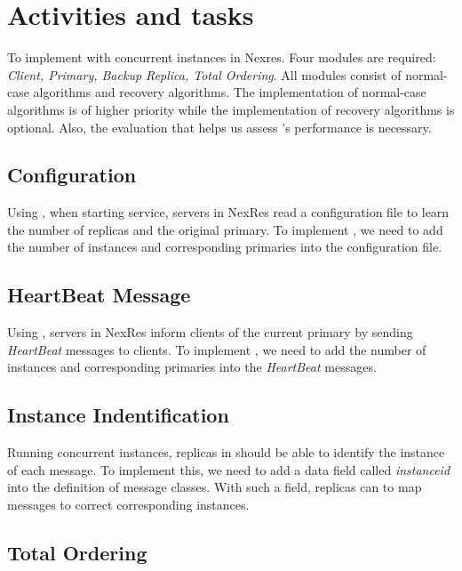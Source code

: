 \section{Activities and tasks}

\par To implement \RCC{} with concurrent \PBFT{} instances in Nexres. Four modules are required: \emph{Client, 
Primary, Backup Replica, Total Ordering}. All modules consist of normal-case algorithms and recovery algorithms. 
The implementation of normal-case algorithms is of higher priority while the implementation of recovery algorithms 
is optional. Also, the evaluation that helps us assess \RCC{}'s performance is necessary.

\subsection{Configuration}

\par Using \PBFT{}, when starting service, servers in NexRes read a configuration file to learn the number of replicas 
and the original primary. To implement \RCC{}, we need to add the number of instances and corresponding primaries into 
the configuration file. 

\subsection{HeartBeat Message}

\par Using \PBFT{}, servers in NexRes inform clients of the current primary by sending \emph{HeartBeat} messages to 
clients. To implement \RCC{}, we need to add the number of instances and corresponding primaries into 
the \emph{HeartBeat} messages.

\subsection{Instance Indentification}

\par Running concurrent instances, replicas in \RCC{} should be able to identify the instance of each message. 
To implement this, we need to add a data field called \emph{instanceid} into the definition of message classes. With 
such a field, replicas can to map messages to correct corresponding instances.

\subsection{Total Ordering}

